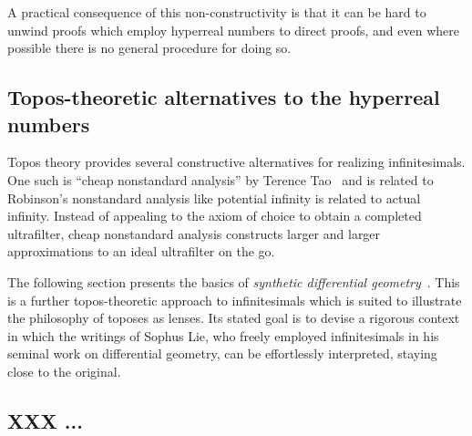 \documentclass[oneside]{amsart}
\theoremstyle{definition}
\theoremstyle{plain}
\theoremstyle{remark}
\renewcommand{\_}{\mathpunct{.}\,}
\newcommand{\?}{\,{:}\,}
\begin{document}
A practical consequence of this non-constructivity is that it can be hard to
unwind proofs which employ hyperreal numbers to direct proofs, and even where
possible there is no general procedure for doing so.


\subsection{Topos-theoretic alternatives to the hyperreal numbers} Topos theory
provides several constructive alternatives for realizing infinitesimals.
One such is ``cheap nonstandard analysis'' by Terence Tao~\cite{tao:cheap-nsa}
and is related to Robinson's nonstandard analysis like potential infinity is
related to actual infinity. Instead of appealing to the axiom of choice to
obtain a completed ultrafilter, cheap nonstandard analysis constructs larger
and larger approximations to an ideal ultrafilter on the go.

The following section presents the basics of \emph{synthetic differential
geometry}~\cite{kock:sdg,kock:new-methods}. This is a further topos-theoretic
approach to infinitesimals which is suited to illustrate the philosophy of toposes
as lenses. Its stated goal is to devise a rigorous context in which the
writings of Sophus Lie, who freely employed infinitesimals in his seminal work
on differential geometry, can be effortlessly interpreted, staying close to the
original.


\subsection{XXX ...}



\printbibliography
\end{document}
